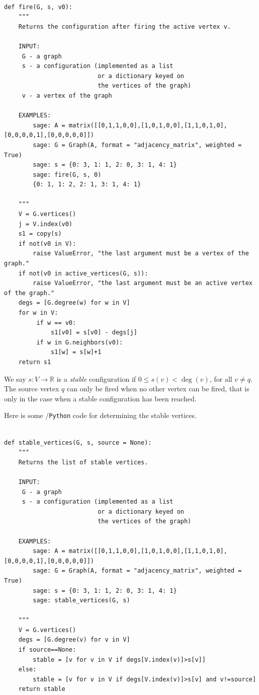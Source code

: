 \begin{Verbatim}[fontsize=\scriptsize,fontfamily=courier,fontshape=tt,frame=single,label=\sage]

def fire(G, s, v0):
    """
    Returns the configuration after firing the active vertex v.

    INPUT:
     G - a graph
     s - a configuration (implemented as a list 
                          or a dictionary keyed on
                          the vertices of the graph)
     v - a vertex of the graph

    EXAMPLES:
        sage: A = matrix([[0,1,1,0,0],[1,0,1,0,0],[1,1,0,1,0],[0,0,0,0,1],[0,0,0,0,0]])
        sage: G = Graph(A, format = "adjacency_matrix", weighted = True)
        sage: s = {0: 3, 1: 1, 2: 0, 3: 1, 4: 1}
        sage: fire(G, s, 0)
        {0: 1, 1: 2, 2: 1, 3: 1, 4: 1}

    """
    V = G.vertices()
    j = V.index(v0)
    s1 = copy(s)
    if not(v0 in V):
        raise ValueError, "the last argument must be a vertex of the graph."
    if not(v0 in active_vertices(G, s)):
        raise ValueError, "the last argument must be an active vertex of the graph."
    degs = [G.degree(w) for w in V]
    for w in V:
         if w == v0:
             s1[v0] = s[v0] - degs[j]
         if w in G.neighbors(v0):
             s1[w] = s[w]+1
    return s1

\end{Verbatim}
We say $s:V\to {\mathbb{R}}$ is a {\it stable} configuration
if $0\leq s(v)<\deg(v)$, for all $v\not= q$.
The source vertex $q$ can only be fired when
no other vertex can be fired, that is only in the case when 
a stable configuration has been reached.

Here is some \sage/{\tt Python} code for determining the stable vertices.

\begin{Verbatim}[fontsize=\scriptsize,fontfamily=courier,fontshape=tt,frame=single,label=\sage]

def stable_vertices(G, s, source = None):
    """
    Returns the list of stable vertices.

    INPUT:
     G - a graph
     s - a configuration (implemented as a list 
                          or a dictionary keyed on
                          the vertices of the graph)

    EXAMPLES:
        sage: A = matrix([[0,1,1,0,0],[1,0,1,0,0],[1,1,0,1,0],[0,0,0,0,1],[0,0,0,0,0]])
        sage: G = Graph(A, format = "adjacency_matrix", weighted = True)
        sage: s = {0: 3, 1: 1, 2: 0, 3: 1, 4: 1}
        sage: stable_vertices(G, s)

    """
    V = G.vertices()
    degs = [G.degree(v) for v in V]
    if source==None:
        stable = [v for v in V if degs[V.index(v)]>s[v]]
    else:
        stable = [v for v in V if degs[V.index(v)]>s[v] and v!=source]
    return stable

\end{Verbatim}


